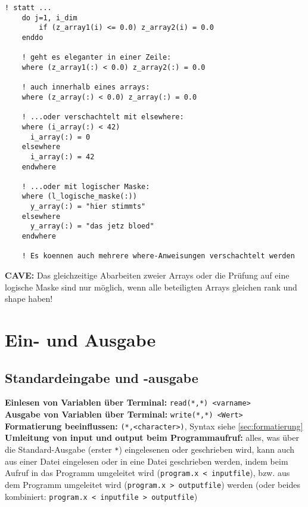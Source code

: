 \documentclass[a4paper, twocolumn]{scrarticle}
\begin{document}
\begin{lstlisting}[caption={\bfseries where-Statement als Ersatz für do-if in Feldern},language=Fortran95Konkret]
	! statt ...
	do j=1, i_dim
		if (z_array1(i) <= 0.0) z_array2(i) = 0.0
	enddo
	
	! geht es eleganter in einer Zeile:
	where (z_array1(:) < 0.0) z_array2(:) = 0.0
	
	! auch innerhalb eines arrays:
	where (z_array(:) < 0.0) z_array(:) = 0.0
	
	! ...oder verschachtelt mit elsewhere:
	where (i_array(:) < 42)
	  i_array(:) = 0
	elsewhere
	  i_array(:) = 42
	endwhere
	
	! ...oder mit logischer Maske:
	where (l_logische_maske(:))
	  y_array(:) = "hier stimmts"
	elsewhere
	  y_array(:) = "das jetz bloed"
	endwhere
	
	! Es koennen auch mehrere where-Anweisungen verschachtelt werden
\end{lstlisting}
\textbf{CAVE:} Das gleichzeitige Abarbeiten zweier Arrays oder die Prüfung auf eine logische Maske sind nur möglich, wenn alle beteiligten Arrays gleichen rank und shape haben!

\section{Ein- und Ausgabe}
\subsection{Standardeingabe und -ausgabe}
\textbf{Einlesen von Variablen über Terminal:} \lstinline|read(*,*) <varname>|\\
\textbf{Ausgabe von Variablen über Terminal:} \lstinline|write(*,*) <Wert>|\\
\textbf{Formatierung beeinflussen:} \lstinline|(*,<character>)|, Syntax siehe \cref{sec:formatierung}\\
\textbf{Umleitung von input und output beim Programmaufruf:} alles, was über die Standard-Ausgabe (erster \lstinline|*|) eingelesenen oder geschrieben wird, kann auch aus einer Datei eingelesen oder in eine Datei geschrieben werden, indem beim Aufruf in das Programm umgeleitet wird (\lstinline[style=neutral]|program.x < inputfile|), bzw. aus dem Programm umgeleitet wird (\lstinline[style=neutral]|program.x > outputfile|) werden (oder beides kombiniert: \lstinline[style=neutral]|program.x < inputfile > outputfile|)
\end{document}
